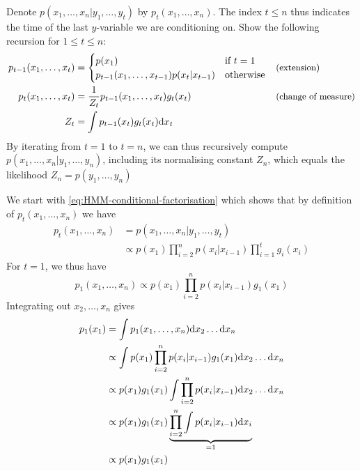 \begin{exenumerate}
\item Denote $ p(x_1, \ldots, x_n|y_1, \ldots, y_t)$ by $p_t(x_1,
  \ldots, x_n)$. The index $t \le n$ thus indicates the time of the
  last $y$-variable we are conditioning on. Show the following
  recursion for $1 \le t \le n$:
  \begin{align}
    p_{t-1}(x_1, \ldots, x_t) &=
    \begin{cases}
      p(x_1) & \text{if } t=1\\
      p_{t-1}(x_1, \ldots, x_{t-1}) p(x_t|x_{t-1}) & \text{otherwise}
      \label{eq:HMM-extension}
    \end{cases} && \text{\small (extension)}\\
  p_{t}(x_1, \ldots, x_{t}) &= \frac{1}{Z_t} p_{t-1}(x_1, \ldots, x_t) g_t(x_t) \label{eq:HMM-change-of-measure} && \text{\small (change of measure)}\\
  Z_t & = \int p_{t-1}(x_t) g_t(x_t) \ud x_t 
\end{align}
By iterating from $t=1$ to $t=n$, we can thus recursively compute
$p(x_1, \ldots, x_n|y_1, \ldots, y_n)$, including its normalising
constant $Z_n$, which equals the likelihood $ Z_n= p(y_1, \ldots, y_n)$ 

\begin{solution}
  We start with \eqref{eq:HMM-conditional-factorisation} which shows
  that by definition of $p_t(x_1, \ldots, x_n)$ we have
  \begin{align}
    p_t(x_1, \ldots, x_n) & = p(x_1, \ldots, x_n | y_1, \ldots, y_t)\\
    &\propto p(x_1) \prod_{i=2}^n p(x_i|x_{i-1}) \prod_{i=1}^t g_i(x_i)
    \label{eq:HMM-conditional-factorisation-2} 
  \end{align}
  For $t=1$, we thus have
  \begin{equation}
    p_1(x_1, \ldots, x_n) \propto  p(x_1) \prod_{i=2}^n p(x_i|x_{i-1}) g_1(x_1)
  \end{equation}
  Integrating out $x_2, \ldots, x_n$ gives
  \begin{align}
    p_1(x_1) & = \int p_1(x_1, \ldots, x_n) \mathrm{d} x_2 \ldots \mathrm{d} x_n\\
    &\propto \int  p(x_1) \prod_{i=2}^n p(x_i|x_{i-1}) g_1(x_1)\mathrm{d} x_2 \ldots \mathrm{d} x_n\\
    &\propto p(x_1) g_1(x_1) \int  \prod_{i=2}^n p(x_i|x_{i-1})\mathrm{d} x_2 \ldots \mathrm{d} x_n\\
    &\propto p(x_1) g_1(x_1) \underbrace{\prod_{i=2}^n \int p(x_i|x_{i-1})\mathrm{d} x_i}_{=1}\\
    &\propto p(x_1) g_1(x_1)
  \end{align}


\end{solution}
\end{exenumerate}
